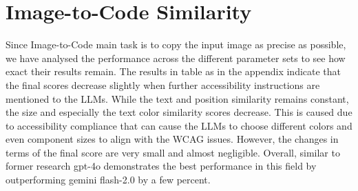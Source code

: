 \section{Image-to-Code Similarity}
Since Image-to-Code main task is to copy the input image as precise as possible,
we have analysed the performance across the different parameter sets to see how 
exact their results remain. The results in table as in the appendix 
indicate that the final scores decrease slightly when further accessibility 
instructions are mentioned to the LLMs. While the text and position similarity 
remains constant, the size and especially the text color similarity scores 
decrease. This is caused due to accessibility compliance that can cause the
LLMs to choose different colors and even component sizes to align with the 
WCAG issues. However, the changes in terms of the final score are very small 
and almost negligible.\newline
Overall, similar to former research gpt-4o demonstrates the best performance 
in this field by outperforming gemini flash-2.0 by a few percent.







